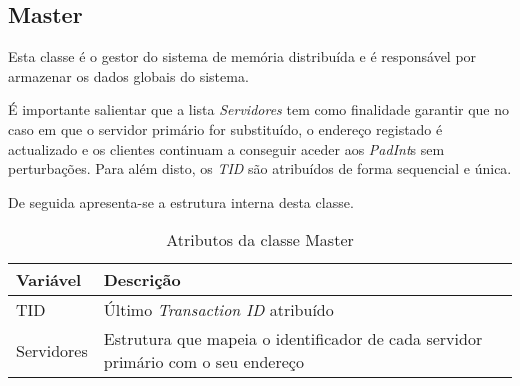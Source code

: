 \subsection{Master}

Esta classe é o gestor do sistema de memória distribuída e é responsável por armazenar os dados globais do sistema. 

É importante salientar que a lista \textit{Servidores} tem como finalidade garantir que no caso em que o servidor primário for substituído, o endereço registado é actualizado e os clientes continuam a conseguir aceder aos \textit{PadInt}s sem perturbações. Para além disto, os \textit{TID} são atribuídos de forma sequencial e única. 

De seguida apresenta-se a estrutura interna desta classe.
\begin{table}[H]
\centering
\begin{tabular}{| p{2cm} | p{5cm} |}
\hline
\textbf{Variável} & \textbf{Descrição} \\
\hline
TID & Último \textit{Transaction ID} atribuído \\
\hline
Servidores & Estrutura que mapeia o identificador de cada servidor primário com o seu endereço \\
\hline
\end{tabular}
\caption{Atributos da classe Master}
\end{table}
